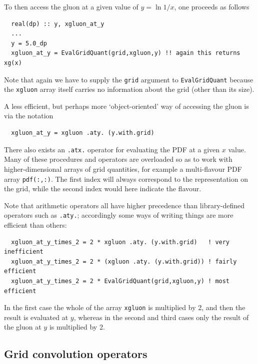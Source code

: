 \documentclass[12pt]{article}
\newcommand{\ttt}[1]{\texttt{#1}}
\begin{document}
To then access the gluon at a given value of $y = \ln 1/x$, one
proceeds as follows
\begin{lstlisting}
  real(dp) :: y, xgluon_at_y
  ...
  y = 5.0_dp
  xgluon_at_y = EvalGridQuant(grid,xgluon,y) !! again this returns xg(x)
\end{lstlisting}
Note that again we have to supply 
the \texttt{grid} argument to \ttt{EvalGridQuant}
because the \ttt{xgluon} array itself carries no information about the
grid (other than its size).

A less efficient, but perhaps more `object-oriented' way of accessing
the gluon is via the notation 
\begin{lstlisting}
  xgluon_at_y = xgluon .aty. (y.with.grid)
\end{lstlisting}
There also exists an \ttt{.atx.} operator for evaluating the PDF at a
given $x$ value.  Many of these procedures and operators are
overloaded so as to work with higher-dimensional arrays of grid
quantities, for example a multi-flavour
PDF array \texttt{pdf(:,:)}. The first index will
always correspond to the representation on the grid, while the second
index would here indicate the flavour.

Note that arithmetic operators all have higher precedence than
library-defined operators such as \texttt{.aty.}; accordingly some
ways of writing things are more efficient than others:
\begin{lstlisting}
  xgluon_at_y_times_2 = 2 * xgluon .aty. (y.with.grid)   ! very inefficient
  xgluon_at_y_times_2 = 2 * (xgluon .aty. (y.with.grid)) ! fairly efficient
  xgluon_at_y_times_2 = 2 * EvalGridQuant(grid,xgluon,y) ! most efficient
\end{lstlisting}
In the first case the whole of the array \texttt{xgluon} is multiplied
by 2, and then the result is evaluated at $y$, whereas in the second
and third
cases only the result of the gluon at $y$ is multiplied by 2.

\subsection{Grid convolution operators}
\label{sec:conv}
\end{document}
